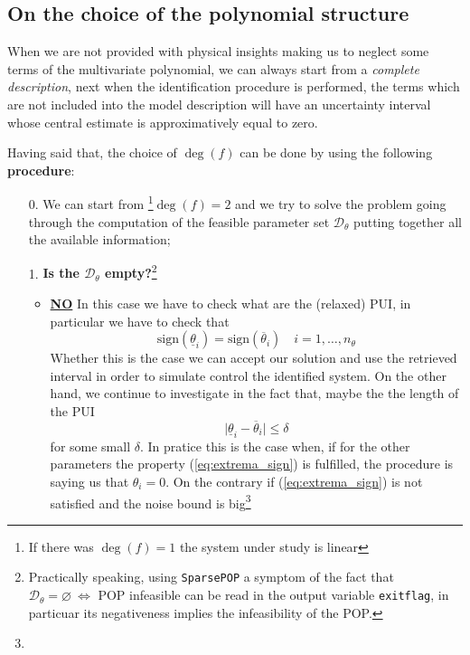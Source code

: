 \subsection{On the choice of the polynomial structure}
When we are not provided with physical insights making us to neglect some terms of the multivariate polynomial, we can always start from a \textit{complete description}, next when the identification procedure is performed, the terms which are not included into the model description will have an uncertainty interval whose central estimate is approximatively equal to zero.

Having said that, the choice of $\deg(f)$ can be done by using the following \textbf{procedure}: 
\begin{enumerate}
    \item[0.] We can start from \footnote{
        If there was $\deg(f)=1$ the system under study is linear
    }$\deg(f)=2$ and we try to solve the problem going through the computation of the feasible parameter set $\mathcal{D}_\theta$ putting together all the available information;\item[1.]\textbf{\large Is the $\mathcal{D}_\theta$ empty?}\footnote{
        Practically speaking, using \texttt{SparsePOP} a symptom of the fact that $\mathcal{D}_\theta=\varnothing \ \iff $ POP infeasible can be read in the output variable \texttt{exitflag}, in particuar its negativeness implies the infeasibility of the POP. 
    }
    \begin{itemize}
        \itemsep-0.3em
        \item {\Large{\color{green}\underline{\textbf{NO}}}} In this case we have to check what are the (relaxed) PUI, in particular we have to check that
        \begin{equation} \label{eq:extrema_sign}
            \text{sign}(\underline{\theta}_i) = 
            \text{sign}(\overline{\theta}_i) \quad i=1,\dots,n_\theta
        \end{equation} 
        Whether this is the case we can accept our solution and use the retrieved interval in order to simulate control the identified system. On the other hand, we continue to investigate in the fact that, maybe the the length of the PUI
        \begin{equation}
            \vert \underline{\theta}_i-\overline{\theta}_i \vert \le \delta
        \end{equation}
         for some small $\delta$. In pratice this is the case when, if for the other parameters the property (\ref{eq:extrema_sign}) is fulfilled, the procedure is saying us that $\theta_i=0$. On the contrary if (\ref{eq:extrema_sign}) is not satisfied and the noise bound is big\footnote{
}
\end{itemize}
\end{enumerate}
